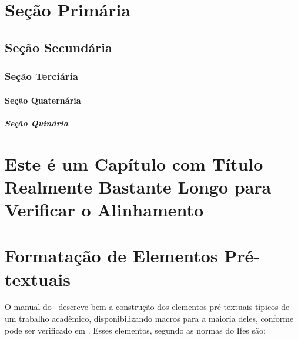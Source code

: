 \documentclass[times,english,brazilian,oneside,section=TITLE]{ifes8}
\begin{document}
\chapter{Seção Primária}
\label{cha:secao-primaria}

\blindtext[1]

\section{Seção Secundária}
\label{sec:secao-secundaria}

\blindtext[1]

\subsection{Seção Terciária}
\label{sec:secao-terciaria}

\blindtext[1]

\subsubsection{Seção Quaternária}
\label{sec:secao-quaternaria}

\blindtext[1]

\paragraph{Seção Quinária}
\label{sec:secao-quinaria}

\blindtext[1]


\chapter{Este é um Capítulo com Título Realmente Bastante
  Longo para Verificar o Alinhamento}


\blindtext



\chapter{Formatação de Elementos Pré-textuais}
\label{cha:format-pre-text}

O manual do \abnTeX\ descreve bem a construção dos elementos
pré-textuais típicos de um trabalho acadêmico, disponibilizando macros
para a maioria deles, conforme pode ser verificado em
\cite[cap.~6]{Araujo2016}. Esses elementos, segundo as normas do Ifes
são:
\end{document}
